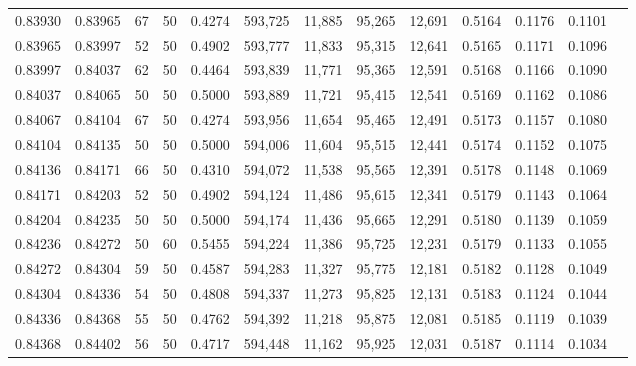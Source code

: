 \begin{tabular}{rrrrrrrrrrrrr}
0.83930 & 0.83965 &    67 &  50 &                                     0.4274 & 593,725 &  11,885 &  95,265 &  12,691 & 0.5164 & 0.1176 & 0.1101 \\
0.83965 & 0.83997 &    52 &  50 &                                     0.4902 & 593,777 &  11,833 &  95,315 &  12,641 & 0.5165 & 0.1171 & 0.1096 \\
0.83997 & 0.84037 &    62 &  50 &                                     0.4464 & 593,839 &  11,771 &  95,365 &  12,591 & 0.5168 & 0.1166 & 0.1090 \\
0.84037 & 0.84065 &    50 &  50 &                                     0.5000 & 593,889 &  11,721 &  95,415 &  12,541 & 0.5169 & 0.1162 & 0.1086 \\
0.84067 & 0.84104 &    67 &  50 &                                     0.4274 & 593,956 &  11,654 &  95,465 &  12,491 & 0.5173 & 0.1157 & 0.1080 \\
0.84104 & 0.84135 &    50 &  50 &                                     0.5000 & 594,006 &  11,604 &  95,515 &  12,441 & 0.5174 & 0.1152 & 0.1075 \\
0.84136 & 0.84171 &    66 &  50 &                                     0.4310 & 594,072 &  11,538 &  95,565 &  12,391 & 0.5178 & 0.1148 & 0.1069 \\
0.84171 & 0.84203 &    52 &  50 &                                     0.4902 & 594,124 &  11,486 &  95,615 &  12,341 & 0.5179 & 0.1143 & 0.1064 \\
0.84204 & 0.84235 &    50 &  50 &                                     0.5000 & 594,174 &  11,436 &  95,665 &  12,291 & 0.5180 & 0.1139 & 0.1059 \\
0.84236 & 0.84272 &    50 &  60 &                                     0.5455 & 594,224 &  11,386 &  95,725 &  12,231 & 0.5179 & 0.1133 & 0.1055 \\
0.84272 & 0.84304 &    59 &  50 &                                     0.4587 & 594,283 &  11,327 &  95,775 &  12,181 & 0.5182 & 0.1128 & 0.1049 \\
0.84304 & 0.84336 &    54 &  50 &                                     0.4808 & 594,337 &  11,273 &  95,825 &  12,131 & 0.5183 & 0.1124 & 0.1044 \\
0.84336 & 0.84368 &    55 &  50 &                                     0.4762 & 594,392 &  11,218 &  95,875 &  12,081 & 0.5185 & 0.1119 & 0.1039 \\
0.84368 & 0.84402 &    56 &  50 &                                     0.4717 & 594,448 &  11,162 &  95,925 &  12,031 & 0.5187 & 0.1114 & 0.1034 \\

\end{tabular}
